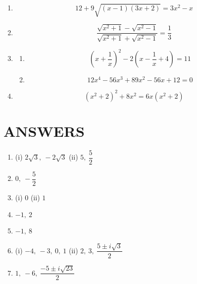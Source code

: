 \documentclass[12pt,a4paper]{article}
\begin{document}
\begin{enumerate}[label=\textbf{\arabic*.}, leftmargin=1.8em, start=6]
		\item 
		\[12 + 9\sqrt{(x-1)(3x+2)} = 3x^{2} - x\]
		
		\item 
		\[\frac{\sqrt{x^{2} + 1} - \sqrt{x^{2} - 1}}{\sqrt{x^{2} + 1} + \sqrt{x^{2} - 1}} = \frac{1}{3}\]
		
		\item 
		\begin{enumerate}[label=(\roman*), leftmargin=2.2em]
			\item \[\left(x + \frac{1}{x}\right)^{2} - 2\left(x - \frac{1}{x} + 4\right) = 11\]
			\item \[12x^{4} - 56x^{3} + 89x^{2} - 56x + 12 = 0\]
		\end{enumerate}
		
		\item 
		\[(x^{2} + 2)^{2} + 8x^{2} = 6x(x^{2} + 2)\]
	\end{enumerate}
	
	\vspace{0.8cm}
	\section*{ANSWERS}
	
	\begin{enumerate}[label=\textbf{\arabic*.}, leftmargin=1.8em]
		\item (i) \(2\sqrt{3},\ -2\sqrt{3}\) \quad (ii) \(5,\ \dfrac{5}{2}\)
		
		\item \(0,\ -\dfrac{5}{2}\)
		
		\item (i) \(0\) \quad (ii) \(1\)
		
		\item \(-1,\ 2\)
		
		\item \(-1,\ 8\)
		
		\item (i) \(-4,\ -3,\ 0,\ 1\) \quad 
		(ii) \(2,\ 3,\ \dfrac{5 \pm i\sqrt{3}}{2}\)
		
		\item \(1,\ -6,\ \dfrac{-5 \pm i\sqrt{23}}{2}\)
	\end{enumerate}
	
\end{document}
